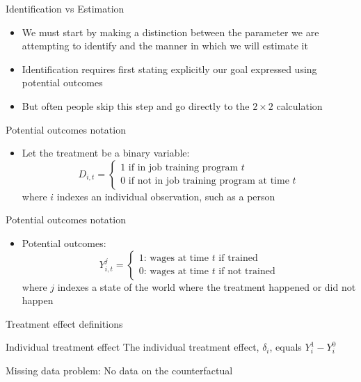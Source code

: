 \documentclass{beamer}
\begin{document}
\begin{frame}{Identification vs Estimation}

\begin{itemize}
\item We must start by making a distinction between the parameter we are attempting to identify and the manner in which we will estimate it
\item Identification requires first stating explicitly our goal expressed using potential outcomes
\item But often people skip this step and go directly to the  $2 \times 2$ calculation

\end{itemize}

\end{frame}






\begin{frame}{Potential outcomes notation}

	\begin{itemize}
	\item Let the treatment be a binary variable: $$D_{i,t} =\begin{cases} 1 \text{ if in job training program $t$} \\ 0 \text{ if not in job training program at time $t$} \end{cases}$$where $i$ indexes an individual observation, such as a person

	\end{itemize}
\end{frame}

\begin{frame}{Potential outcomes notation}

	\begin{itemize}

	\item Potential outcomes: $$Y_{i,t}^j =\begin{cases} 1 \text{: wages at time $t$ if trained} \\ 0 \text{: wages at time $t$ if not trained} \end{cases}$$where $j$ indexes a state of the world where the treatment happened or did not happen

	\end{itemize}
\end{frame}



\begin{frame}{Treatment effect definitions}


	\begin{block}{Individual treatment effect}
	    The individual treatment effect,  $\delta_i$, equals $Y_i^1-Y_i^0$
	\end{block}

Missing data problem:  No data on the counterfactual

\end{frame}
\end{document}
